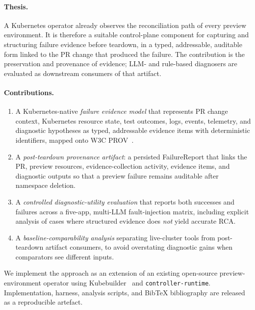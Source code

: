\documentclass[sigconf, nonacm=true, anonymous=false, review=false]{acmart}
\newcommand{\fp}{FailureReport\xspace}
\begin{document}
\paragraph{Thesis.}
A Kubernetes operator already observes the reconciliation path of every
preview environment. It is therefore a suitable control-plane component
for capturing and structuring failure evidence before teardown, in a typed,
addressable, auditable form linked to the PR change that produced the
failure. The contribution is the preservation and provenance of evidence;
LLM- and rule-based diagnosers are evaluated as downstream consumers of
that artifact.

\paragraph{Contributions.}
\begin{enumerate}
  \item A Kubernetes-native \emph{failure evidence model} that
    represents PR change context, Kubernetes resource state, test
    outcomes, logs, events, telemetry, and diagnostic hypotheses as typed,
    addressable evidence items with deterministic identifiers, mapped onto
    W3C PROV~\cite{lebo_provo_2013, w3c_prov_dm}.
  \item A \emph{post-teardown provenance artifact}: a persisted
    \fp{} that links the PR, preview resources, evidence-collection
    activity, evidence items, and diagnostic outputs so that a preview
    failure remains auditable after namespace deletion.
  \item A \emph{controlled diagnostic-utility evaluation} that reports
    both successes and failures across a five-app, multi-LLM
    fault-injection matrix, including explicit analysis of cases where
    structured evidence does \emph{not} yield accurate RCA.
  \item A \emph{baseline-comparability analysis} separating live-cluster
    tools from post-teardown artifact consumers, to avoid overstating
    diagnostic gains when comparators see different inputs.
\end{enumerate}

We implement the approach as an extension of an existing open-source
preview-environment operator using
Kubebuilder~\cite{kubebuilder_sigs} and \texttt{controller-runtime}.
Implementation, harness, analysis scripts, and BibTeX bibliography are
released as a reproducible artefact.
\end{document}
